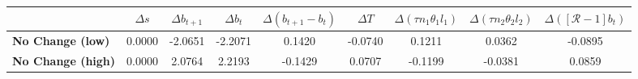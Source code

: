 \begin{tiny}\begin{tabular}{|l|c|c|c|c|c|c|c|c|}
\hline
&\textbf{$\Delta s$}&\textbf{$\Delta b_{t+1}$}&\textbf{$\Delta b_{t}$}&\textbf{$\Delta (b_{t+1}-b_t)$}&\textbf{$\Delta T$}&\textbf{$\Delta (\tau n_1\theta_1 l_1 )$}&\textbf{$\Delta (\tau n_2\theta_2 l_2)$}&\textbf{$\Delta ([\mathcal{R}-1]b_t)$}\\\hline
\textbf{No Change (low)}&0.0000&-2.0651&-2.2071&0.1420&-0.0740&0.1211&0.0362&-0.0895\\\hline
\textbf{No Change (high)}&0.0000&2.0764&2.2193&-0.1429&0.0707&-0.1199&-0.0381&0.0859\\\hline
\end{tabular}
\end{tiny}